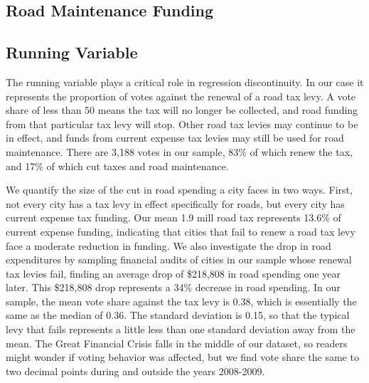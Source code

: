 






\subsection{Road Maintenance Funding}



\subsection{Running Variable}

The running variable plays a critical role in regression discontinuity.  In our case it represents the proportion of votes against the renewal of a road tax levy.  A vote share of less than 50 means the tax will no longer be collected, and road funding from that particular tax levy will stop.  Other road tax levies may continue to be in effect, and funds from current expense tax levies may still be used for road maintenance.  There are 3,188 votes in our sample, 83\% of which renew the tax, and 17\% of which cut taxes and road maintenance.

We quantify the size of the cut in road spending a city faces in two ways.  First, not every city has a tax levy in effect specifically for roads, but every city has current expense tax funding.  Our mean 1.9 mill road tax represents 13.6\% of current expense funding, indicating that cities that fail to renew a road tax levy face a moderate reduction in funding.  We also investigate the drop in road expenditures by sampling financial audits of cities in our sample whose renewal tax levies fail, finding an average drop of \$218,808 in road spending one year later.  This \$218,808 drop represents a 34\% decrease in road spending.  
In our sample, the mean vote share against the tax levy is 0.38, which is essentially the same as the median of 0.36.  The standard deviation is 0.15, so that the typical levy that fails represents a little less than one standard deviation away from the mean. The Great Financial Crisis falls in the middle of our dataset, so readers might wonder if voting behavior was affected, but we find vote share the same to two decimal points during and outside the years 2008-2009. 


